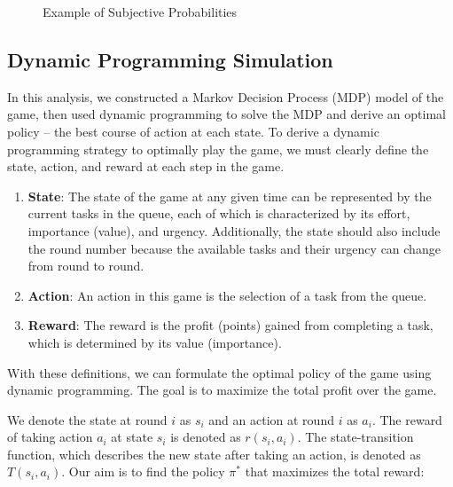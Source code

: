 \documentclass[
]{article}
\begin{document}
\begin{figure}
\begin{minipage}[t]{0.50\linewidth}
{{}

}

\end{minipage}%

\caption{\label{fig-prob-weighting}Example of Subjective Probabilities}

\end{figure}

\hypertarget{dynamic-programming-simulation}{%
\subsection{Dynamic Programming
Simulation}\label{dynamic-programming-simulation}}

In this analysis, we constructed a Markov Decision Process (MDP) model
of the game, then used dynamic programming to solve the MDP and derive
an optimal policy -- the best course of action at each state. To derive
a dynamic programming strategy to optimally play the game, we must
clearly define the state, action, and reward at each step in the game.

\begin{enumerate}
\def\labelenumi{\arabic{enumi}.}
\item
  \textbf{State}: The state of the game at any given time can be
  represented by the current tasks in the queue, each of which is
  characterized by its effort, importance (value), and urgency.
  Additionally, the state should also include the round number because
  the available tasks and their urgency can change from round to round.
\item
  \textbf{Action}: An action in this game is the selection of a task
  from the queue.
\item
  \textbf{Reward}: The reward is the profit (points) gained from
  completing a task, which is determined by its value (importance).
\end{enumerate}

With these definitions, we can formulate the optimal policy of the game
using dynamic programming. The goal is to maximize the total profit over
the game.

We denote the state at round \(i\) as \(s_i\) and an action at round
\(i\) as \(a_i\). The reward of taking action \(a_i\) at state \(s_i\)
is denoted as \(r(s_i, a_i)\). The state-transition function, which
describes the new state after taking an action, is denoted as
\(T(s_i, a_i)\). Our aim is to find the policy \(\pi^*\) that maximizes
the total reward:
\end{document}
